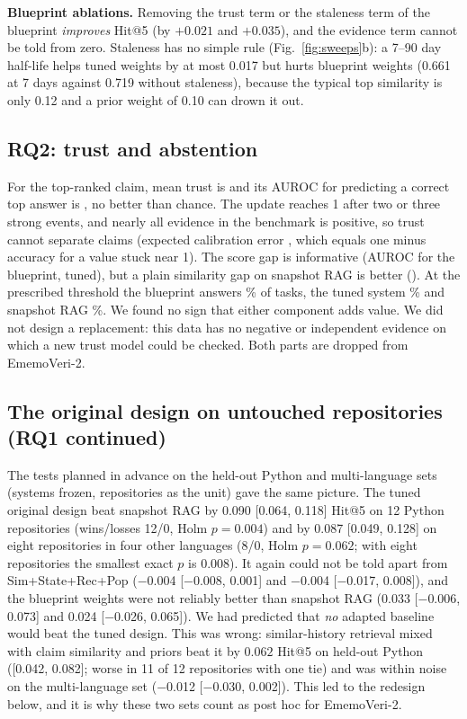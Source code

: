 \documentclass[conference]{IEEEtran}
\newcommand{\sys}{EmemoVeri}
\begin{document}
\textbf{Blueprint ablations.} Removing the trust term or the staleness term of the blueprint \emph{improves} Hit@5 (by $+0.021$ and $+0.035$), and the evidence term cannot be told from zero. Staleness has no simple rule (Fig.~\ref{fig:sweeps}b): a 7--90 day half-life helps tuned weights by at most 0.017 but hurts blueprint weights (0.661 at 7 days against 0.719 without staleness), because the typical top similarity is only 0.12 and a prior weight of 0.10 can drown it out.

\subsection{RQ2: trust and abstention}
\label{sec:trust}
For the top-ranked claim, mean trust is \trustMean{} and its AUROC for predicting a correct top answer is \aurocTrustEmv{}, no better than chance. The update reaches 1 after two or three strong events, and nearly all evidence in the benchmark is positive, so trust cannot separate claims (expected calibration error \trustECE{}, which equals one minus accuracy for a value stuck near 1). The score gap is informative (AUROC \aurocGapEmv{} for the blueprint, \aurocGapTuned{} tuned), but a plain similarity gap on snapshot RAG is better (\aurocGapSnap{}). At the prescribed threshold the blueprint answers \covTwentyEmv{}\% of tasks, the tuned system \covTwentyTuned{}\% and snapshot RAG \covTwentySnap{}\%. We found no sign that either component adds value. We did not design a replacement: this data has no negative or independent evidence on which a new trust model could be checked. Both parts are dropped from \sys{}-2.

\subsection{The original design on untouched repositories (RQ1 continued)}
\label{sec:heldout}
The tests planned in advance on the held-out Python and multi-language sets (systems frozen, repositories as the unit) gave the same picture. The tuned original design beat snapshot RAG by 0.090 [0.064, 0.118] Hit@5 on 12 Python repositories (wins/losses 12/0, Holm $p=0.004$) and by 0.087 [0.049, 0.128] on eight repositories in four other languages (8/0, Holm $p=0.062$; with eight repositories the smallest exact $p$ is 0.008). It again could not be told apart from Sim+State+Rec+Pop ($-$0.004 [$-$0.008, 0.001] and $-$0.004 [$-$0.017, 0.008]), and the blueprint weights were not reliably better than snapshot RAG (0.033 [$-$0.006, 0.073] and 0.024 [$-$0.026, 0.065]). We had predicted that \emph{no} adapted baseline would beat the tuned design. This was wrong: similar-history retrieval mixed with claim similarity and priors beat it by $0.062$ Hit@5 on held-out Python ([0.042, 0.082]; worse in 11 of 12 repositories with one tie) and was within noise on the multi-language set ($-$0.012 [$-$0.030, 0.002]). This led to the redesign below, and it is why these two sets count as post hoc for \sys{}-2.
\end{document}
